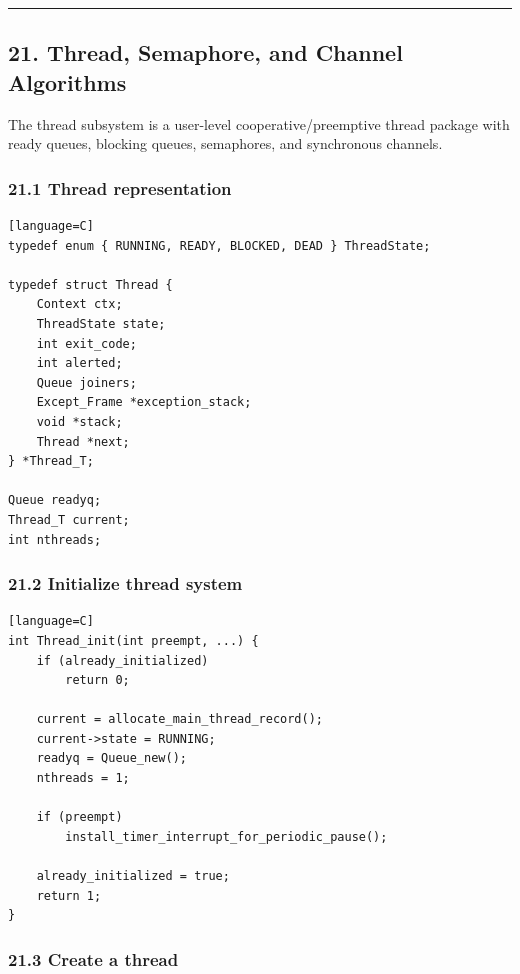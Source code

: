 \documentclass[11pt]{article}
\begin{document}
\begin{center}\rule{0.5\linewidth}{0.5pt}\end{center}

\subsection{21. Thread, Semaphore, and Channel Algorithms}\label{thread-semaphore-and-channel-algorithms}

The thread subsystem is a user-level cooperative/preemptive thread package with ready queues, blocking queues, semaphores, and synchronous channels.

\subsubsection{21.1 Thread representation}\label{thread-representation}

\begin{verbatim}[language=C]
typedef enum { RUNNING, READY, BLOCKED, DEAD } ThreadState;

typedef struct Thread {
    Context ctx;
    ThreadState state;
    int exit_code;
    int alerted;
    Queue joiners;
    Except_Frame *exception_stack;
    void *stack;
    Thread *next;
} *Thread_T;

Queue readyq;
Thread_T current;
int nthreads;
\end{verbatim}

\subsubsection{21.2 Initialize thread system}\label{initialize-thread-system}

\begin{verbatim}[language=C]
int Thread_init(int preempt, ...) {
    if (already_initialized)
        return 0;

    current = allocate_main_thread_record();
    current->state = RUNNING;
    readyq = Queue_new();
    nthreads = 1;

    if (preempt)
        install_timer_interrupt_for_periodic_pause();

    already_initialized = true;
    return 1;
}
\end{verbatim}

\subsubsection{21.3 Create a thread}\label{create-a-thread}
\end{document}
